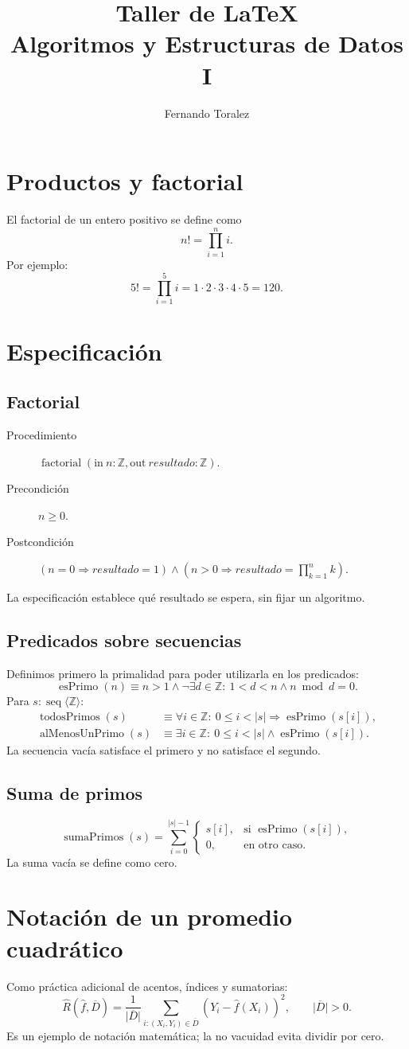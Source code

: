 \documentclass[11pt,a4paper]{article}
\title{Taller de \LaTeX\\Algoritmos y Estructuras de Datos I}
\author{Fernando Toralez}
\date{}
\newcommand{\ent}{\mathbb Z}
\newcommand{\seq}[1]{\operatorname{seq}\langle#1\rangle}
\newcommand{\longitud}[1]{\lvert#1\rvert}
\begin{document}
\maketitle
\tableofcontents
\newpage
\section{Productos y factorial}
El factorial de un entero positivo se define como
\[
 n!=\prod_{i=1}^{n}i.
\]
Por ejemplo:
\[
 5!=\prod_{i=1}^{5}i=1\cdot2\cdot3\cdot4\cdot5=120.
\]
\section{Especificación}
\subsection{Factorial}
\begin{description}
 \item[Procedimiento] $\operatorname{factorial}(\mathrm{in}\ n:\ent,
              \mathrm{out}\ resultado:\ent)$.
 \item[Precondición] $n\geq0$.
 \item[Postcondición]
 $(n=0\Rightarrow resultado=1)\land
  (n>0\Rightarrow resultado=\prod_{k=1}^{n}k)$.
\end{description}
La especificación establece qué resultado se espera, sin fijar un algoritmo.
\subsection{Predicados sobre secuencias}
Definimos primero la primalidad para poder utilizarla en los predicados:
\[
 \operatorname{esPrimo}(n)\equiv n>1\land
 \neg\exists d\in\ent:\ 1<d<n\land n\bmod d=0.
\]
Para $s:\seq{\ent}$:
\begin{align*}
 \operatorname{todosPrimos}(s)
 &\equiv \forall i\in\ent:\ 0\leq i<\longitud{s}
                   \Rightarrow \operatorname{esPrimo}(s[i]),\\
 \operatorname{alMenosUnPrimo}(s)
 &\equiv \exists i\in\ent:\ 0\leq i<\longitud{s}
                   \land \operatorname{esPrimo}(s[i]).
\end{align*}
La secuencia vacía satisface el primero y no satisface el segundo.
\subsection{Suma de primos}
\[
 \operatorname{sumaPrimos}(s)=
 \sum_{i=0}^{\longitud{s}-1}
 \begin{cases}
   s[i],&\text{si }\operatorname{esPrimo}(s[i]),\\
   0,&\text{en otro caso}.
 \end{cases}
\]
La suma vacía se define como cero.
\section{Notación de un promedio cuadrático}
Como práctica adicional de acentos, índices y sumatorias:
\[
 \widehat R(\widehat f,\overline D)=
 \frac{1}{\lvert\overline D\rvert}
 \sum_{i:(X_i,Y_i)\in\overline D}
       (Y_i-\widehat f(X_i))^2,\qquad \lvert\overline D\rvert>0.
\]
Es un ejemplo de notación matemática; la no vacuidad evita dividir por cero.
\end{document}
